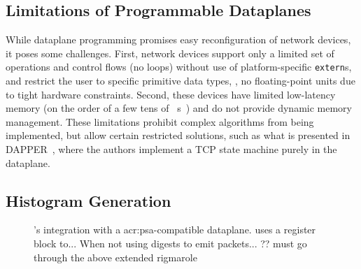 





\subsection{Limitations of Programmable Dataplanes}
While dataplane programming promises easy reconfiguration of network devices, it poses some challenges.
First, network devices support only a limited set of operations and control flows (no loops) without use of platform-specific \texttt{extern}s, and restrict the user to specific primitive data types, \ie, no floating-point units due to tight hardware constraints.
Second, these devices have limited low-latency memory (on the order of a few tens of \si{\mega\byte}s~\parencite{DBLP:conf/sosp/JinLZSLFKS17}) and do not provide dynamic memory management.
These limitations prohibit complex algorithms from being implemented, but allow certain restricted solutions, such as what is presented in DAPPER~\parencite{DBLP:conf/sosr/GhasemiBR17}, where the authors implement a TCP state machine purely in the dataplane.

\subsection{Histogram Generation}

\begin{figure}
    \centering
    \caption[\seidr{}'s integration with a PSA-compatible dataplane.]{\seidr{}'s integration with a \gls{acr:psa}-compatible dataplane. \seidr{} uses a register block to... When not using digests to emit packets... ?? must go through the above extended rigmarole}
    \label{fig:arch}
\end{figure}


